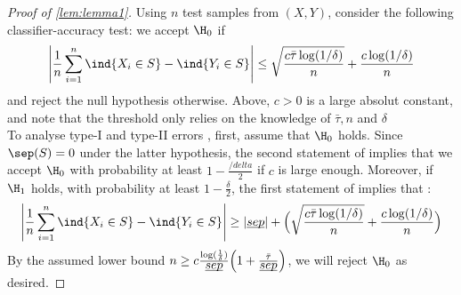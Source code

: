 \begin{proof}[Proof of \cref{lem:lemma1}]
    Using $n$ test samples from $(X,Y)$, consider the following classifier-accuracy test: we accept $\H_0$ if  
    \begin{equation*}
        \Bigg| \frac{1}{n} \sum_{i=1}^{n} \ind{X_i \in S}-\ind{Y_i \in S} \Bigg| \leq \sqrt{\frac{c\bar{\tau}\log(1/\delta)}{n}} + \frac{c\log(1/\delta)}{n}
    \end{equation*}
    and reject the null hypothesis otherwise. Above, $c>0$ is a large absolut constant, and note that the threshold only relies on the knowledge of $\bar{\tau},n$ and $\delta$\\
    To analyse type-I and type-II errors , first, assume that $\H_0$ holds. Since $\sep(S) = 0$ under the latter hypothesis, the second statement of  implies that we accept $\H_0$ with probability at least $1-\frac{/delta}{2}$ if $c$ is large enough.
    Moreover, if $\H_1$ holds, with probability at least $1-\frac{\delta}{2}$, the first statement of  implies that : 
    \begin{equation*}
        \Bigg| \frac{1}{n}\sum_{i=1}^{n} \ind{X_i \in S} -\ind{Y_i \in S} \Bigg| \geq \left| \underbar{$sep$} \right| + \Bigl(\sqrt{\frac{c\bar{\tau}\log(1/\delta)}{n}} + \frac{c\log(1/\delta)}{n}\Bigr)
     \end{equation*}
     By the assumed lower bound $n \geq c\frac{\log(\frac{1}{\delta})}{\underbar{$sep$}}\Bigl(1+ \frac{\bar{\tau}}{\underbar{$sep$}}\Bigr)$, we will reject $\H_0$ as desired.
\end{proof}
